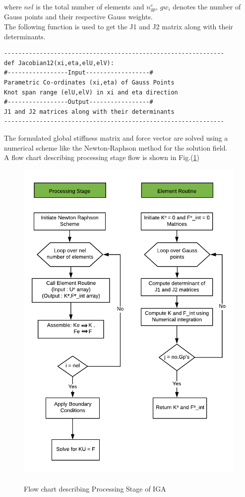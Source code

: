 \documentclass[11pt]{article}
\begin{document}
\noindent
where $nel$ is the total number of elements and $n_{gp}^e$, $gw_i$ denotes the
number of Gauss points and their respective Gauss weights.\\
\noindent
The following function is used to get the J1 and J2 matrix along with their determinants.
\begin{verbatim}
--------------------------------------------------------------
def Jacobian12(xi,eta,elU,elV):
#-----------------Input------------------#
Parametric Co-ordinates (xi,eta) of Gauss Points
Knot span range (elU,elV) in xi and eta direction
#-----------------Output-----------------#
J1 and J2 matrices along with their determinants
--------------------------------------------------------------
\end{verbatim}
The formulated global stiffness matrix and force vector are solved using a numerical scheme like the Newton-Raphson method for the solution field.
\\A flow chart describing processing stage flow is shown in Fig.(\ref{Processing})
\begin{figure}[H]
	\begin{center}
		\includegraphics[scale=1.0]{Processing.png} 
		\caption{\\Flow chart describing Processing Stage of IGA}\label{Processing}
	\end{center}
\end{figure}
\end{document}
